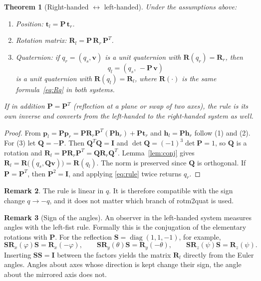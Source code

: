 \documentclass{article}
\theoremstyle{plain}
\newtheorem{theorem}{Theorem}
\theoremstyle{definition}
\newtheorem{remark}[theorem]{Remark}
\newcommand{\vect}[1]{\boldsymbol{#1}}
\begin{document}
\begin{theorem}[Right-handed $\leftrightarrow$ left-handed]\label{thm:main}
Under the assumptions above:
\begin{enumerate}
  \item Position: $\vect t_l = \vect P\, \vect t_r$.
  \item Rotation matrix: $\vect R_l = \vect P\, \vect R_r\, \vect P^T$.
  \item Quaternion: if $q_r = (q_s, \vect v)$ is a unit quaternion with
        $\vect R(q_r) = \vect R_r$, then
        \begin{equation}\label{eq:rule}
          q_l = (q_s,\, -\vect P\, \vect v)
        \end{equation}
        is a unit quaternion with $\vect R(q_l) = \vect R_l$, where $\vect R(\cdot)$ is the same
        formula~\eqref{eq:Rq} in both systems.
\end{enumerate}
If in addition $\vect P = \vect P^T$ (reflection at a plane or swap of two axes), the rule is its
own inverse and converts from the left-handed to the right-handed system as well.
\end{theorem}

\begin{proof}
From $\vect p_l = \vect P \vect p_r = \vect P \vect R_r \vect P^T (\vect P \vect h_r) + \vect P \vect t_r$
and $\vect h_l = \vect P \vect h_r$ follow (1) and (2). For (3) let $\vect Q = -\vect P$. Then
$\vect Q^T \vect Q = \vect I$ and $\det \vect Q = (-1)^3 \det \vect P = 1$, so $\vect Q$ is a
rotation and $\vect R_l = \vect P \vect R_r \vect P^T = \vect Q \vect R_r \vect Q^T$.
Lemma~\ref{lem:conj} gives $\vect R_l = \vect R\bigl((q_s, \vect Q\vect v)\bigr) = \vect R(q_l)$.
The norm is preserved since $\vect Q$ is orthogonal. If $\vect P = \vect P^T$, then
$\vect P^2 = \vect I$, and applying \eqref{eq:rule} twice returns $q_r$.
\end{proof}

\begin{remark}
The rule is linear in $q$. It is therefore compatible with the sign change $q \to -q$, and it does
not matter which branch of rotm2quat is used.
\end{remark}

\begin{remark}[Sign of the angles]\label{rem:angles}
An observer in the left-handed system measures angles with the left-fist rule. Formally this is
the conjugation of the elementary rotations with $\vect P$. For the reflection
$\vect S = \operatorname{diag}(1,1,-1)$, for example,
\begin{equation}
  \vect S \vect R_x(\varphi) \vect S = \vect R_x(-\varphi),\qquad
  \vect S \vect R_y(\theta) \vect S = \vect R_y(-\theta),\qquad
  \vect S \vect R_z(\psi) \vect S = \vect R_z(\psi).
\end{equation}
Inserting $\vect S\vect S = \vect I$ between the factors yields the matrix $\vect R_l$ directly from
the Euler angles. Angles about axes whose direction is kept change their sign, the angle about the
mirrored axis does not.
\end{remark}
\end{document}
